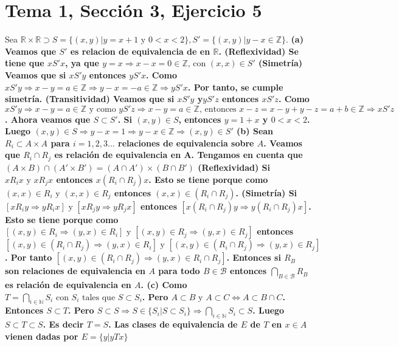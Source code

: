 \documentclass{article}
\begin{document}
\section{Tema 1, Sección 3, Ejercicio 5}
Sea \(\mathbb{R} \times \mathbb{R}\supset S =\{(x,y)|y=x+1 \text{ y } 0<x<2\}, S' =\{(x,y)|y-x \in \mathbb{Z}\}\).
\newline
\bf (a) \rm Veamos que \(S'\) es relacion de equivalencia de en \(\mathbb{R}\).
(Reflexividad) Se tiene que \(xS'x\), ya que \(y=x \Rightarrow x-x=0\in \mathbb{Z} \text{, con }(x,x)\in S'\) (Simetría) Veamos que si \(xS'y\) entonces \(yS'x\). Como \(xS'y \Rightarrow x-y=a\in  \mathbb{Z} \Rightarrow y-x=-a  \in \mathbb{Z}\Rightarrow yS'x\). Por tanto, se cumple simetría. (Transitividad) Veamos que  si \(xS'y\) y\(yS'z\) entonces \(xS'z\). Como \(xS'y \Rightarrow x-y=a\in  \mathbb{Z}  \text{ y como } yS'z \Rightarrow x-y=a\in  \mathbb{Z} \text{, entonces }x-z= x-y + y-z=a + b \in \mathbb{Z}\Rightarrow xS'z\). Ahora veamos que \(S \subset S'\). Si \((x,y)\in S\), entonces \(y=1+x\) y \(0<x<2\). Luego \((x,y)\in S \Rightarrow y-x=1 \Rightarrow y-x\in\mathbb{Z}\Rightarrow (x,y)\in S'\)
\newline
\bf (b) \rm Sean \(R_{i}\subset A\times A\) para \(i=1, 2, 3...\) relaciones de equivalencia sobre \(A\). Veamos que \(R_{i} \cap R_{j}\) es relación de equivalencia en A.
Tengamos en cuenta que \((A\times B)\cap (A'\times B')=(A \cap A')\times (B \cap B')\)
(Reflexividad) Si \(xR_{i}x \text{ y } xR_{j}x\) entonces \(x(R_{i}\cap R_{j})x\). Esto se tiene porque como \((x,x)\in R_{i} \text{ y } (x,x)\in R_{j} \) entonces \((x,x)\in (R_{i} \cap R_{j})\). (Simetría) Si \([xR_{i}y\Rightarrow yR_{i}x]\text{ y } [xR_{j}y \Rightarrow yR_{j}x]\) entonces \([x(R_{i}\cap R_{j})y\Rightarrow y(R_{i}\cap R_{j})x]\). Esto se tiene porque como \([(x,y)\in R_{i} \Rightarrow (y,x) \in R_{i}] \text{ y } [(x,y)\in R_{j}\Rightarrow (y,x)\in R_{j}]\) entonces \([(x,y)\in (R_{i} \cap R_{j})\Rightarrow (y, x)\in R_{i}] \text{ y }[(x,y)\in (R_{i} \cap R_{j})\Rightarrow (y, x)\in R_{j}]\). Por tanto \([(x,y)\in (R_{i} \cap R_{j})\Rightarrow (y, x)\in R_{i}\cap R_{j}]\). Entonces si \(R_{B}\) son relaciones de equivalencia en \(A\) para todo \(B \in \mathcal{B}\) entonces \(\bigcap\limits_{B\in \mathcal{B}}R_{B} \) es relación de equivalencia en \(A\). \newline
\bf (c) \rm Como \(T=\bigcap \limits_{i\in \mathbb{N}}S_{i}\text{ con } S_{i} \text{ tales que }S\subset S_{i}\). Pero \(A\subset B \text{ y } A\subset C \Leftrightarrow A\subset B\cap C\). Entonces \(S\subset T\). Pero \(S\subset S\Rightarrow S\in \{S_{i}|S\subset S_{i}\} \Rightarrow \bigcap \limits_{i\in \mathbb{N}}S_{i}\subset S\). Luego \( S\subset T\subset S\). Es decir \(T= S\). Las clases de equivalencia de \(E\) de \(T\) en \(x\in A\) vienen dadas por \(E=\{ y | yTx \}\)
%
%
\end{document}
